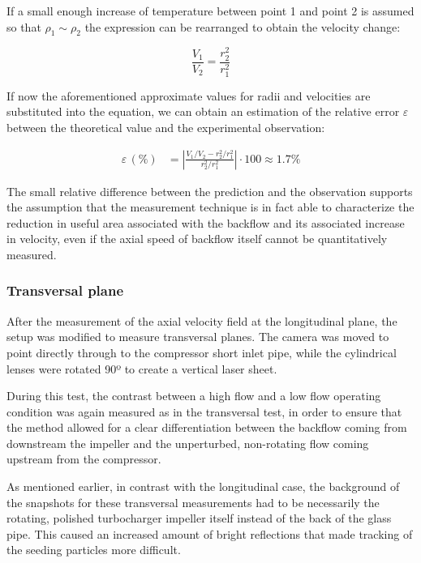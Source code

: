If a small enough increase of temperature between point 1 and point 2 is assumed so that $\rho_1\sim\rho_2$ the expression can be rearranged to obtain the velocity change:

\begin{equation}
  \frac{V_1}{V_2} = \frac{r_2^2}{r_1^2}
\end{equation}

If now the aforementioned approximate values for radii and velocities are substituted into the equation, we can obtain an estimation of the relative error $\varepsilon$ between the theoretical value and the experimental observation:

\begin{align}
  \varepsilon\, (\%) &= \left|\frac{V_1/V_2-r_2^2/r_1^2}{r_2^2/r_1^2}\right| \cdot 100 \approx 1.7\%
\end{align}

The small relative difference between the prediction and the observation supports the assumption that the measurement technique is in fact able to characterize the reduction in useful area associated with the backflow and its associated increase in velocity, even if the axial speed of backflow itself cannot be quantitatively measured.

\subsubsection{Transversal plane}

After the measurement of the axial velocity field at the longitudinal plane, the setup was modified to measure transversal planes. The camera was moved to point directly through to the compressor short inlet pipe, while the cylindrical lenses were rotated 90º to create a vertical laser sheet.

During this test, the contrast between a high flow and a low flow operating condition was again measured as in the transversal test, in order to ensure that the method allowed for a clear differentiation between the backflow coming from downstream the impeller and the unperturbed, non-rotating flow coming upstream from the compressor.

As mentioned earlier, in contrast with the longitudinal case, the background of the snapshots for these transversal measurements had to be necessarily the rotating, polished turbocharger impeller itself instead of the back of the glass pipe. This caused an increased amount of bright reflections that made tracking of the seeding particles more difficult. 

